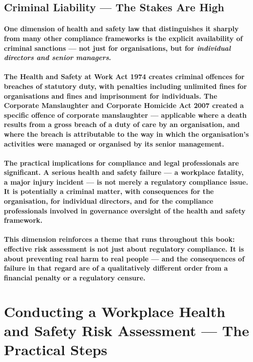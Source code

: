 \subsection{Criminal Liability — The Stakes Are High}
\paragraph{One dimension of health and safety law that distinguishes it sharply from many other compliance frameworks is the explicit availability of \textbf{criminal sanctions} — not just for organisations, but for \textbf{\textit{individual directors and senior managers}}.}
\paragraph{The \textbf{Health and Safety at Work Act 1974} creates criminal offences for breaches of statutory duty, with penalties including unlimited fines for organisations and fines and imprisonment for individuals. The Corporate Manslaughter and \textbf{Corporate Homicide Act 2007} created a specific offence of corporate manslaughter — applicable where a death results from a gross breach of a duty of care by an organisation, and where the breach is attributable to the way in which the organisation's activities were managed or organised by its senior management.}
\paragraph{The practical implications for compliance and legal professionals are significant. A serious health and safety failure — a workplace fatality, a major injury incident — is not merely a regulatory compliance issue. It is potentially a criminal matter, with consequences for the organisation, for individual directors, and for the compliance professionals involved in governance oversight of the health and safety framework.}
\paragraph{This dimension reinforces a theme that runs throughout this book: effective risk assessment is not just about regulatory compliance. It is about preventing real harm to real people — and the consequences of failure in that regard are of a qualitatively different order from a financial penalty or a regulatory censure.}

\section{Conducting a Workplace Health and Safety Risk Assessment — The Practical Steps}
